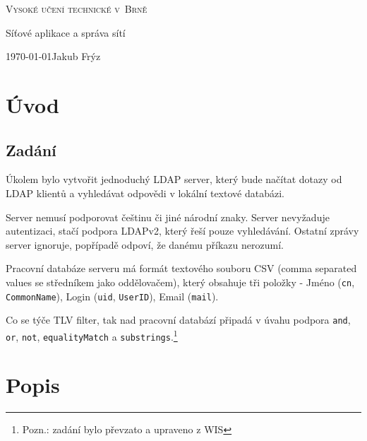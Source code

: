 \documentclass[a4paper, 11pt]{article}
\begin{document}
\begin{titlepage}
\begin{center}

\textsc{{\Huge Vysoké učení technické v~Brně}\\}


{\LARGE Síťové aplikace a správa sítí}\\


{\Large \today \hfill Jakub Frýz}

\end{center}
\end{titlepage}

\tableofcontents
\pagebreak

\section{Úvod}

\subsection{Zadání}

Úkolem bylo vytvořit jednoduchý LDAP server, který bude načítat dotazy od LDAP klientů a vyhledávat odpovědi v lokální textové databázi.

Server nemusí podporovat češtinu či jiné národní znaky. Server nevyžaduje autentizaci, stačí podpora LDAPv2, který řeší pouze vyhledávání. Ostatní zprávy server ignoruje, popřípadě odpoví, že danému příkazu nerozumí.

Pracovní databáze serveru má formát textového souboru CSV (comma separated values se středníkem jako oddělovačem), který obsahuje tři položky - Jméno (\texttt{cn}, \texttt{CommonName}), Login (\texttt{uid}, \texttt{UserID}), Email (\texttt{mail}).

Co se týče TLV filter, tak nad pracovní databází připadá v úvahu podpora \texttt{and}, \texttt{or}, \texttt{not}, \texttt{equalityMatch} a \texttt{substrings}.\footnote{Pozn.: zadání bylo převzato a upraveno z WIS}

\pagebreak


\section{Popis}
\end{document}
